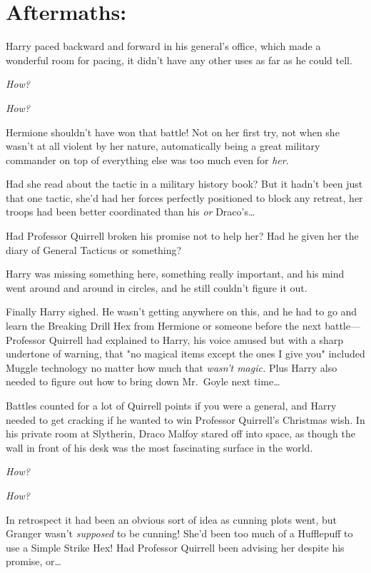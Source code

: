 
\section{Aftermaths:}

Harry paced backward and forward in his general's office, which made a
wonderful room for pacing, it didn't have any other uses as far as he could
tell.

\emph{How?}

\emph{How?}

Hermione shouldn't have won that battle! Not on her first try, not when she
wasn't at all violent by her nature, automatically being a great military
commander on top of everything else was too much even for \emph{her}.

Had she read about the tactic in a military history book? But it hadn't been
just that one tactic, she'd had her forces perfectly positioned to block any
retreat, her troops had been better coordinated than his \emph{or}
Draco's{\ldots}

Had Professor Quirrell broken his promise not to help her? Had he given her the
diary of General Tacticus or something?

Harry was missing something here, something really important, and his mind went
around and around in circles, and he still couldn't figure it out.

Finally Harry sighed. He wasn't getting anywhere on this, and he had to go and
learn the Breaking Drill Hex from Hermione or someone before the next
battle---Professor Quirrell had explained to Harry, his voice amused but with a
sharp undertone of warning, that "no magical items except the ones I give you"
included Muggle technology no matter how much that \emph{wasn't magic.} Plus
Harry also needed to figure out how to bring down Mr.~Goyle next time{\ldots}

Battles counted for a lot of Quirrell points if you were a general, and Harry
needed to get cracking if he wanted to win Professor Quirrell's Christmas wish.
\later
In his private room at Slytherin, Draco Malfoy stared off into space, as though
the wall in front of his desk was the most fascinating surface in the world.

\emph{How?}

\emph{How?}

In retrospect it had been an obvious sort of idea as cunning plots went, but
Granger wasn't \emph{supposed} to be cunning! She'd been too much of a
Hufflepuff to use a Simple Strike Hex! Had Professor Quirrell been advising her
despite his promise, or{\ldots}

